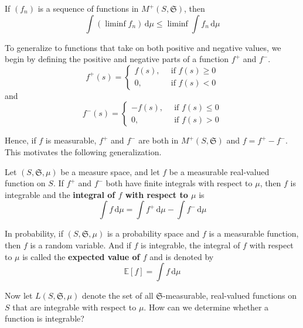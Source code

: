 \begin{lemma}
	If $(f_n)$ is a sequence of functions in $M^+(S, \mathfrak{S})$, then
	\[
		\int (\liminf f_n)\, \mathrm{d}\mu \leq \liminf \int f_n\, \mathrm{d}\mu
	\]
\end{lemma}

To generalize to functions that take on both positive and negative values, we begin by defining the positive and negative parts of a function $f^+$ and $f^-$.
\begin{equation*}
	f^+(s) = 
    \begin{cases}
      f(s), \, &\text{ if } f(s) \geq 0 \\
	  0, \, &\text{ if } f(s) < 0
    \end{cases}
\end{equation*}
and
\begin{equation*}
	f^-(s) = 
    \begin{cases}
      -f(s), \, &\text{ if } f(s) \leq 0 \\
	  0, \, &\text{ if } f(s) > 0
    \end{cases}
\end{equation*}

Hence, if $f$ is measurable, $f^+$ and $f^-$ are both in $M^+(S, \mathfrak{S})$ and $f = f^+ - f^-$. This motivates the following generalization.

\begin{definition}
	Let $(S, \mathfrak{S}, \mu)$ be a measure space, and let $f$ be a measurable real-valued function on $S$. If $f^+$ and $f^-$ both have finite integrals with respect to $\mu$, then $f$ is integrable and the \textbf{integral of $f$ with respect to $\mu$} is 
	\[
		\int f \, \mathrm{d}\mu = \int f^+ \, \mathrm{d}\mu - \int f^- \, \mathrm{d}\mu
	\]
\end{definition}

In probability, if $(S, \mathfrak{S}, \mu)$ is a probability space and $f$ is a measurable function, then $f$ is a random variable. And if $f$ is integrable, the integral of $f$ with respect to $\mu$ is called the \textbf{expected value of $f$} and is denoted by
\[
	\mathbb{E}[f] = \int f \, \mathrm{d}\mu
\]

Now let $L(S, \mathfrak{S}, \mu)$ denote the set of all $\mathfrak{S}$-measurable, real-valued functions on $S$ that are integrable with respect to $\mu$. How can we determine whether a function is integrable?

